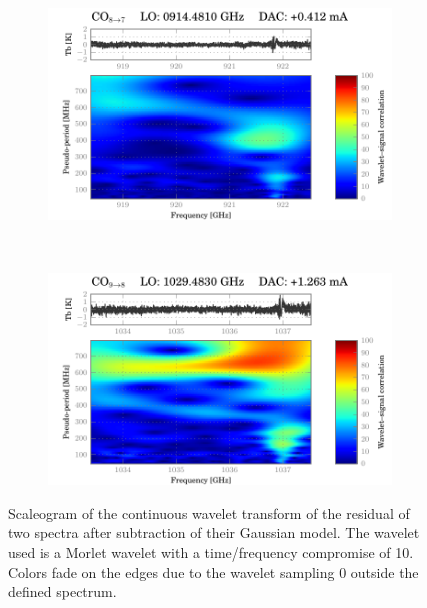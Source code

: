\begin{figure}[p]
    \centering
    \begin{subfigure}[b]{\textwidth}
        \centering
        \includegraphics[width=\textwidth]{50015e1d_WBS-H-USB_04-16_fit_wavelet}
    \end{subfigure}\\
    \begin{subfigure}[b]{\textwidth}
        \centering
        \includegraphics[width=\textwidth]{50015d89_WBS-H-USB_00-12_fit_wavelet}
    \end{subfigure}
    \caption{
        Scaleogram of the continuous wavelet transform
        of the residual of two spectra after subtraction of their Gaussian model.
        The wavelet used is a Morlet wavelet with a time/frequency compromise of 10.
        Colors fade on the edges due to the wavelet sampling 0 outside the defined spectrum.
    }
    \label{fig:wavelet}
\end{figure}

